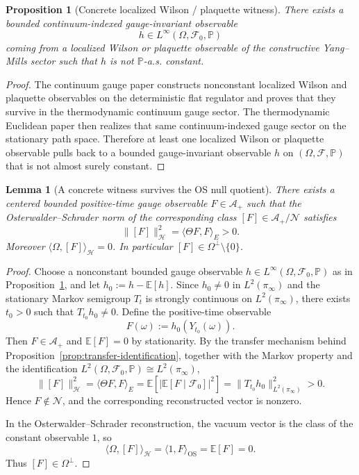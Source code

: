 \documentclass[11pt]{article}
\newtheorem{proposition}[theorem]{Proposition}
\newtheorem{lemma}[theorem]{Lemma}
\theoremstyle{definition}
\theoremstyle{remark}
\newcommand{\mcA}{\mathcal A}
\newcommand{\mcH}{\mathcal H}
\newcommand{\mcN}{\mathcal N}
\begin{document}
\begin{proposition}[Concrete localized Wilson / plaquette witness]
\label{prop:concrete-witness}
There exists a bounded continuum-indexed gauge-invariant observable
\[
h\in L^\infty(\Omega,\mathcal F_0,\mathbb P)
\]
coming from a localized Wilson or plaquette observable of the constructive
Yang--Mills sector such that \(h\) is not \(\mathbb P\)-a.s. constant.
\end{proposition}

\begin{proof}
The continuum gauge paper constructs nonconstant localized Wilson and plaquette
observables on the deterministic flat regulator and proves that they survive in
the thermodynamic continuum gauge sector.  The thermodynamic Euclidean paper
then realizes that same continuum-indexed gauge sector on the stationary path
space.  Therefore at least one localized Wilson or plaquette observable pulls
back to a bounded gauge-invariant observable \(h\) on
\((\Omega,\mathcal F,\mathbb P)\) that is not almost surely constant.
\end{proof}

\begin{lemma}[A concrete witness survives the OS null quotient]
\label{lem:scalar-witness-survives}
There exists a centered bounded positive-time gauge observable
$F\in\mcA_+$ such that the Osterwalder--Schrader norm of the corresponding
class $[F]\in \mcA_+/\mcN$ satisfies
\[
\|[F]\|_{\mcH}^2
=
\langle \Theta F,F\rangle_E
>
0.
\]
Moreover $\langle \Omega,[F]\rangle_{\mcH}=0$.  In particular
$[F]\in\Omega^\perp\setminus\{0\}$.
\end{lemma}

\begin{proof}
Choose a nonconstant bounded gauge observable
$h\in L^\infty(\Omega,\mathcal F_0,\mathbb P)$ as in
Proposition~\ref{prop:concrete-witness}, and let
$h_0:=h-\mathbb E[h]$.  Since $h_0\neq0$ in $L^2(\pi_\infty)$ and the stationary
Markov semigroup $T_t$ is strongly continuous on $L^2(\pi_\infty)$, there
exists $t_0>0$ such that $T_{t_0}h_0\neq0$.  Define the positive-time observable
\[
F(\omega):=h_0(Y_{t_0}(\omega)).
\]
Then $F\in\mcA_+$ and $\mathbb E[F]=0$ by stationarity.  By the transfer
mechanism behind Proposition~\ref{prop:transfer-identification}, together with
the Markov property and the identification
$L^2(\Omega,\mathcal F_0,\mathbb P)\cong L^2(\pi_\infty)$,
\[
\|[F]\|_{\mcH}^2
=
\langle \Theta F,F\rangle_E
=
\mathbb E\!\left[\left|\mathbb E[F\mid\mathcal F_0]\right|^2\right]
=
\|T_{t_0}h_0\|_{L^2(\pi_\infty)}^2
>
0.
\]
Hence $F\notin\mcN$, and the corresponding reconstructed vector is nonzero.

In the Osterwalder--Schrader reconstruction, the vacuum vector is the class of
the constant observable $1$, so
\[
\langle \Omega,[F]\rangle_{\mcH}
=
\langle 1,F\rangle_{\mathrm{OS}}
=
\mathbb E[F]
=
0.
\]
Thus $[F]\in\Omega^\perp$.
\end{proof}
\end{document}
